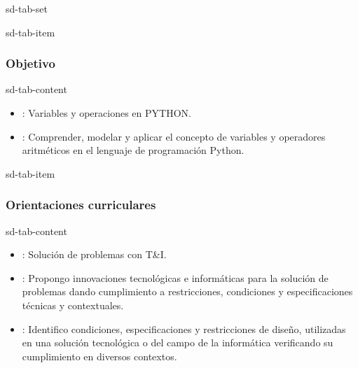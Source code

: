 \documentclass[letterpaper,10pt,spanish]{sphinxmanual}
\begin{document}
\begin{sphinxuseclass}{sd-tab-set}
\begin{sphinxuseclass}{sd-tab-item}\subsubsection*{Objetivo}

\begin{sphinxuseclass}{sd-tab-content}
\sphinxAtStartPar
{}
\begin{itemize}
\item {} 
\sphinxAtStartPar
{}: Variables y operaciones en PYTHON.

\item {} 
\sphinxAtStartPar
{}: Comprender, modelar y aplicar el concepto de variables y operadores aritméticos en el lenguaje de programación Python.

\end{itemize}

\end{sphinxuseclass}
\end{sphinxuseclass}
\begin{sphinxuseclass}{sd-tab-item}\subsubsection*{Orientaciones curriculares}

\begin{sphinxuseclass}{sd-tab-content}\begin{itemize}
\item {} 
\sphinxAtStartPar
{}: Solución de problemas con T\&I.

\item {} 
\sphinxAtStartPar
{}: Propongo innovaciones tecnológicas e informáticas para la solución de problemas dando cumplimiento a restricciones, condiciones y especificaciones técnicas y contextuales.

\item {} 
\sphinxAtStartPar
{}: Identifico condiciones, especificaciones y restricciones de diseño, utilizadas en una solución tecnológica o del campo de la informática verificando su cumplimiento en diversos contextos.


\end{itemize}
\end{sphinxuseclass}
\end{sphinxuseclass}
\end{sphinxuseclass}
\end{document}
